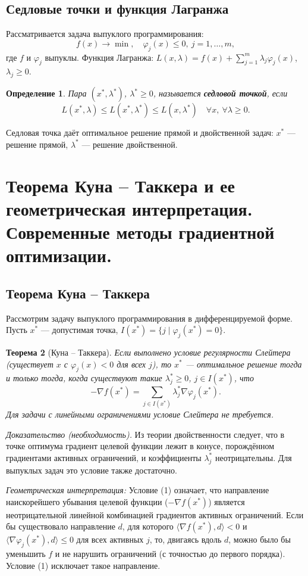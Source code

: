 \documentclass{article}
\theoremstyle{plain}
\newtheorem{theorem}{Теорема}[section]
\newtheorem{definition}[theorem]{Определение}
\begin{document}
\subsection{Седловые точки и функция Лагранжа}
Рассматривается задача выпуклого программирования:
\[
f(x) \to \min,\quad \varphi_j(x) \le 0,\ j=1,\dots,m,
\]
где $f$ и $\varphi_j$ выпуклы.
Функция Лагранжа: $L(x, \lambda) = f(x) + \sum_{j=1}^m \lambda_j \varphi_j(x)$, $\lambda_j \ge 0$.

\begin{definition}
Пара $(x^*, \lambda^*)$, $\lambda^* \ge 0$, называется \textbf{седловой точкой}, если
\[
L(x^*, \lambda) \le L(x^*, \lambda^*) \le L(x, \lambda^*) \quad \forall x,\ \forall \lambda \ge 0.
\]
\end{definition}
Седловая точка даёт оптимальное решение прямой и двойственной задач: $x^*$ — решение прямой, $\lambda^*$ — решение двойственной.

\section{Теорема Куна – Таккера и ее геометрическая интерпретация. Современные методы градиентной оптимизации.}

\subsection{Теорема Куна – Таккера}
Рассмотрим задачу выпуклого программирования в дифференцируемой форме. Пусть $x^*$ — допустимая точка, $I(x^*) = \{j \mid \varphi_j(x^*) = 0\}$.

\begin{theorem}[Куна – Таккера]
Если выполнено условие регулярности Слейтера (существует $x$ с $\varphi_j(x) < 0$ для всех $j$), то $x^*$ — оптимальное решение тогда и только тогда, когда существуют такие $\lambda_j^* \ge 0$, $j \in I(x^*)$, что
\[
-\nabla f(x^*) = \sum_{j \in I(x^*)} \lambda_j^* \nabla \varphi_j(x^*). \tag{1}
\]
Для задачи с линейными ограничениями условие Слейтера не требуется.
\end{theorem}
\textit{Доказательство (необходимость).} Из теории двойственности следует, что в точке оптимума градиент целевой функции лежит в конусе, порождённом градиентами активных ограничений, и коэффициенты $\lambda_j^*$ неотрицательны. Для выпуклых задач это условие также достаточно.

\textit{Геометрическая интерпретация:} Условие (1) означает, что направление наискорейшего убывания целевой функции ($-\nabla f(x^*)$) является неотрицательной линейной комбинацией градиентов активных ограничений. Если бы существовало направление $d$, для которого $\langle \nabla f(x^*), d \rangle < 0$ и $\langle \nabla \varphi_j(x^*), d \rangle \le 0$ для всех активных $j$, то, двигаясь вдоль $d$, можно было бы уменьшить $f$ и не нарушить ограничений (с точностью до первого порядка). Условие (1) исключает такое направление.
\end{document}
